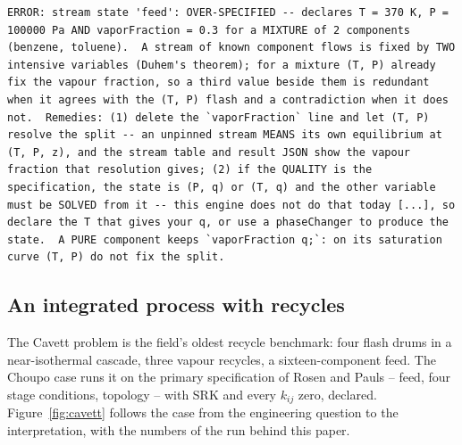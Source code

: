 \documentclass[11pt,a4paper]{article}
\begin{document}
\begin{lstlisting}[caption={A refusal by name (the feed of
  Listing~\ref{lst:case} with \texttt{vaporFraction 0.3;} added); exit
  status 2.},label=lst:refusal, breaklines=true, breakindent=0pt]
ERROR: stream state 'feed': OVER-SPECIFIED -- declares T = 370 K, P = 100000 Pa AND vaporFraction = 0.3 for a MIXTURE of 2 components (benzene, toluene).  A stream of known component flows is fixed by TWO intensive variables (Duhem's theorem); for a mixture (T, P) already fix the vapour fraction, so a third value beside them is redundant when it agrees with the (T, P) flash and a contradiction when it does not.  Remedies: (1) delete the `vaporFraction` line and let (T, P) resolve the split -- an unpinned stream MEANS its own equilibrium at (T, P, z), and the stream table and result JSON show the vapour fraction that resolution gives; (2) if the QUALITY is the specification, the state is (P, q) or (T, q) and the other variable must be SOLVED from it -- this engine does not do that today [...], so declare the T that gives your q, or use a phaseChanger to produce the state.  A PURE component keeps `vaporFraction q;`: on its saturation curve (T, P) do not fix the split.
\end{lstlisting}

\subsection{An integrated process with recycles}
\label{sec:ex-recycle}

The Cavett problem \citep{cavett1963} is the field's oldest recycle
benchmark: four flash drums in a near-isothermal cascade, three vapour
recycles, a sixteen-component feed.  The Choupo case runs it on the primary
specification of Rosen and Pauls \citep{rosen1977, rosen2005} -- feed, four
stage conditions, topology -- with SRK and every $k_{ij}$ zero, declared.
Figure~\ref{fig:cavett} follows the case from the engineering question to
the interpretation, with the numbers of the run behind this paper.
\end{document}
